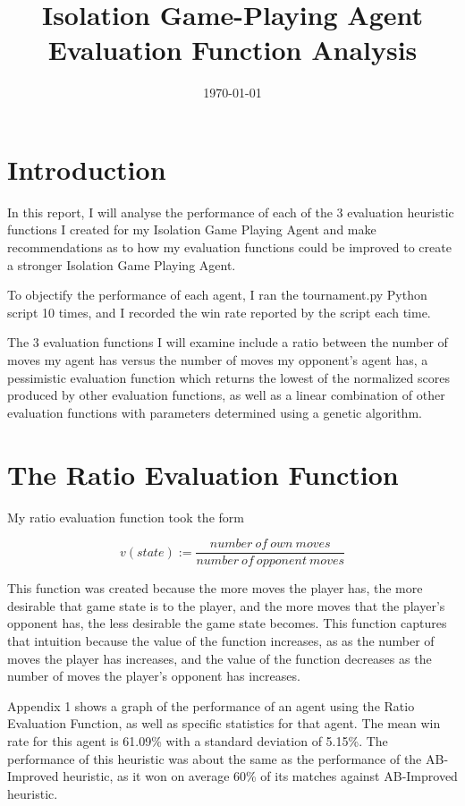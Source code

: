 \documentclass[12pt]{article}
\title{Isolation Game-Playing Agent Evaluation Function Analysis}
\date{\today}
\begin{document}
\maketitle

\section{Introduction}
In this report, I will analyse the performance of each of the 3 evaluation 
heuristic functions I created for my Isolation Game Playing Agent and make 
recommendations as to how my evaluation functions could be improved to create a 
stronger Isolation Game Playing Agent. 

To objectify the performance of each agent, I ran the tournament.py Python 
script 10 times, and I recorded the win rate reported by the script each time.

The 3 evaluation functions I will examine include a ratio between the number of 
moves my agent has versus the number of moves my opponent's agent has, a 
pessimistic evaluation function which returns the lowest of the normalized 
scores produced by other evaluation functions, as well as a linear combination 
of other evaluation functions with parameters determined using a genetic 
algorithm.

\section{The Ratio Evaluation Function}
My ratio evaluation function took the form

\begin{equation*}
v(state):=\dfrac{number\ of\ own\ moves}{number\ of\ opponent\ moves}
\end{equation*}

This function was created because the more moves the player has, the more 
desirable that game state is to the player, and the more moves that the player's 
opponent has, the less desirable the game state becomes. This function captures 
that intuition because the value of the function increases, as as the number of 
moves the player has increases, and the value of the function decreases as the 
number of moves the player's opponent has increases.

Appendix 1 shows a graph of the performance of an agent using the Ratio 
Evaluation Function, as well as specific statistics for that agent. The mean win 
rate for this agent is 61.09\% with a standard deviation of 5.15\%. The 
performance of this heuristic was about the same as the performance of the 
AB-Improved heuristic, as it won on average 60\% of its matches against 
AB-Improved heuristic.
\end{document}
